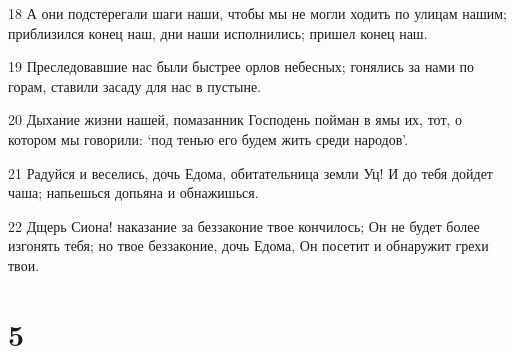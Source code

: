 \par 18 А они подстерегали шаги наши, чтобы мы не могли ходить по улицам нашим; приблизился конец наш, дни наши исполнились; пришел конец наш.
\par 19 Преследовавшие нас были быстрее орлов небесных; гонялись за нами по горам, ставили засаду для нас в пустыне.
\par 20 Дыхание жизни нашей, помазанник Господень пойман в ямы их, тот, о котором мы говорили: `под тенью его будем жить среди народов'.
\par 21 Радуйся и веселись, дочь Едома, обитательница земли Уц! И до тебя дойдет чаша; напьешься допьяна и обнажишься.
\par 22 Дщерь Сиона! наказание за беззаконие твое кончилось; Он не будет более изгонять тебя; но твое беззаконие, дочь Едома, Он посетит и обнаружит грехи твои.

\chapter{5}

